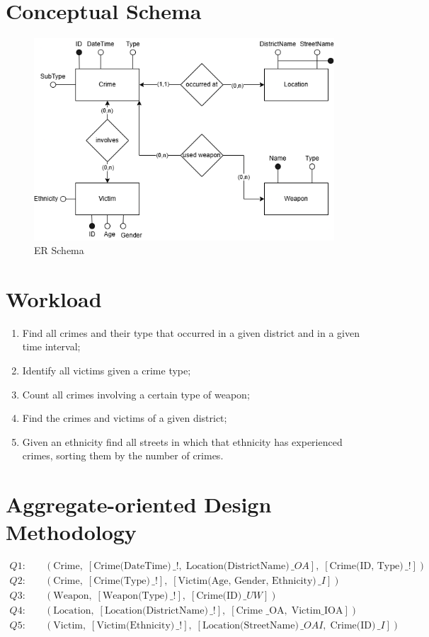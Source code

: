 \newpage
\section{Conceptual Schema}
\begin{figure}
    \centering
    \includegraphics[width=0.8\linewidth]{adm.drawio.png}
    \caption{ER Schema}
    \label{fig:enter-label}
\end{figure}

\section{Workload}
\begin{enumerate}
    \item Find all crimes and their type that occurred in a given district and in a given time interval;
    \item Identify all victims given a crime type;
    \item Count all crimes involving a certain type of weapon;
    \item Find the crimes and victims of a given district;
    \item Given an ethnicity find all streets in which that ethnicity has experienced crimes, sorting them by the number of crimes.
\end{enumerate}

\newpage
\section{Aggregate-oriented Design Methodology}
\[
\begin{aligned}
Q1: & \quad (\text{Crime}, \; [\text{Crime(DateTime)} \, \_!, \; \text{Location(DistrictName)} \, \_OA], \; [\text{Crime(ID, Type)} \, \_!]) \\
Q2: & \quad (\text{Crime}, \; [\text{Crime(Type)} \, \_!], \; [\text{Victim(Age, Gender, Ethnicity)} \, \_I]) \\
Q3: & \quad (\text{Weapon}, \; [\text{Weapon(Type)} \, \_!], \; [\text{Crime(ID)} \, \_UW]) \\
Q4: & \quad (\text{Location}, \; [\text{Location(DistrictName)} \, \_!], \; [\text{Crime \_OA}, \; \text{Victim\_IOA}]) \\
Q5: & \quad (\text{Victim}, \; [\text{Victim(Ethnicity)} \, \_!], \; [\text{Location(StreetName)} \, \_OAI, \; \text{Crime(ID)} \, \_I])
\end{aligned}
\]


